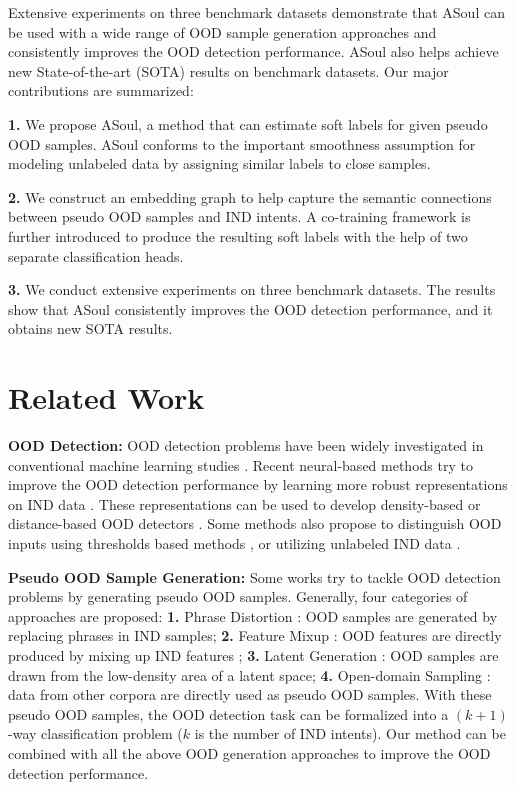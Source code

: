 \documentclass[11pt]{article}
\begin{document}
Extensive experiments on three benchmark datasets demonstrate that ASoul can be used with a wide range of OOD sample generation approaches and consistently improves the OOD detection performance. ASoul also helps achieve new State-of-the-art (SOTA) results on benchmark datasets.
Our major contributions are summarized:

\textbf{1.} We propose ASoul, a method that can estimate soft labels for given pseudo OOD samples. ASoul conforms to the important smoothness assumption for modeling unlabeled data by assigning similar labels to close samples.

\textbf{2.} We construct an embedding graph to help capture the semantic connections between pseudo OOD samples and IND intents. A co-training framework is further introduced to produce the resulting soft labels with the help of two separate classification heads.

\textbf{3.} We conduct extensive experiments on three benchmark datasets. The results show that ASoul consistently improves the OOD detection performance, and it obtains new SOTA results.

\section{Related Work}

\textbf{OOD Detection:}
OOD detection problems have been widely investigated in conventional machine learning studies \cite{geng2020recent}. Recent neural-based methods try to improve the OOD detection performance by learning more robust representations on IND data \cite{zhou-etal-2021-contrastive,zhou2022knn,yan2020unknown,zeng2021adversarial}. These representations can be used to develop density-based or distance-based OOD detectors \cite{lee2018simple,podolskiy2021revisiting,liu2020energy,tan-etal-2019-domain}. Some methods also propose to distinguish OOD inputs using thresholds based methods
\cite{gal2016dropout,lakshminarayanan2017simple,ren2019likelihood,gangal2020likelihood,ryu2017neural}, or utilizing unlabeled IND data \cite{xu-etal-2021-unsupervised,jin2022towards}.

\textbf{Pseudo OOD Sample Generation:} \label{sec:4categorie}
Some works try to tackle OOD detection problems by generating pseudo OOD samples. Generally, four categories of approaches are proposed: 
\textbf{1.} Phrase Distortion \cite{chen2021gold}:
OOD samples are generated by replacing phrases in IND samples;
\textbf{2.} Feature Mixup \cite{zhan2021out}:
OOD features are directly produced by mixing up IND features \cite{zhang2018mixup};
\textbf{3.} Latent Generation \cite{marek2021oodgan}:
OOD samples are drawn from the low-density area of a latent space;
\textbf{4.} Open-domain Sampling \cite{hendrycks2018deep}:
data from other corpora are directly used as pseudo OOD samples.
With these pseudo OOD samples, the OOD detection task can be formalized into a $(k+1)$-way classification problem ($k$ is the number of IND intents). Our method can be combined with all the above OOD generation approaches to improve the OOD detection performance.
\end{document}

